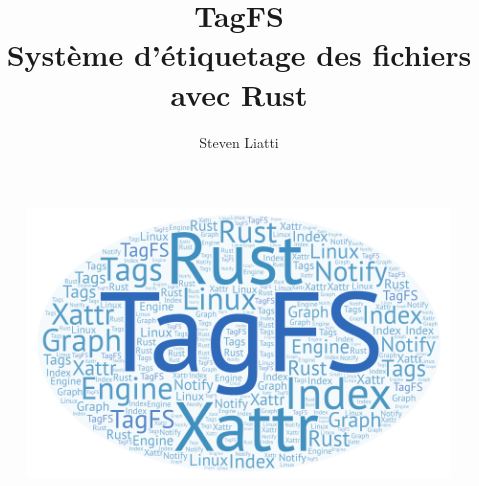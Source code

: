 \documentclass[a4paper, 12pt]{article}
\begin{document}
\title{TagFS \protect\\ Système d'étiquetage des fichiers avec Rust}
\author{Steven Liatti}
\clearpage\maketitle
\thispagestyle{empty}


\begin{figure}
	\begin{center}
		\includegraphics[width=1\textwidth]{images/title.png} 
	\end{center}
\end{figure}
\end{document}
